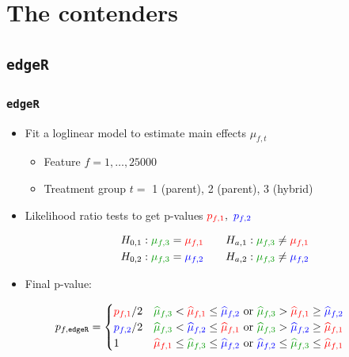 \documentclass[handout]{beamer}
\providecommand{\wh}[1]{\widehat{#1}}
\numberwithin{equation}{section}
\begin{document}
\section{The contenders}

\subsection{{\tt edgeR}}

\begin{frame}
\frametitle{{\tt edgeR}}

\begin{itemize}
\item Fit a loglinear model to estimate main effects $\mu_{f, t}$
\begin{itemize}
\item Feature $f = 1, \ldots, 25000$
\item Treatment group $t = $ {\color{red} 1 (parent)}, {\color{blue} 2 (parent)}, {\color{dkgreen} 3 (hybrid)}
\end{itemize}
\pause \item Likelihood ratio tests to get p-values ${\color{red} p_{f, 1}}, \ {\color{blue} p_{f, 2}}$

\begin{align*}
H_{0, 1}:{\color{dkgreen} \mu_{f, 3}} &= {\color{red}\mu_{f, 1}} \qquad H_{a, 1}: {\color{dkgreen}\mu_{f, 3}} \ne {\color{red} \mu_{f, 1}} \\
H_{0, 2}: {\color{dkgreen} \mu_{f, 3}} &= {\color{blue} \mu_{f, 2}} \qquad H_{a, 2}: {\color{dkgreen}\mu_{f, 3}} \ne {\color{blue}\mu_{f, 2}}
\end{align*}


\pause \item Final p-value:

\end{itemize}


\begin{align*}
p_{f, \text{{\tt edgeR}}} &= \begin{cases}
{\color{red}p_{f, 1}}/{2} &{\color{dkgreen} \wh{\mu}_{f, 3} }< {\color{red}\wh{\mu}_{f, 1}} \le {\color{blue}\wh{\mu}_{f, 2}} \text{ or }{\color{dkgreen}\wh{\mu}_{f, 3}} > {\color{red}\wh{\mu}_{f, 1}} \ge {\color{blue}\wh{\mu}_{f, 2}} \\
{\color{blue}p_{f, 2}}/{2} &{\color{dkgreen} \wh{\mu}_{f, 3}} < {\color{blue}\wh{\mu}_{f, 2}} \le {\color{red}\wh{\mu}_{f, 1}} \text{ or }{\color{dkgreen}\wh{\mu}_{f, 3}} > {\color{blue}\wh{\mu}_{f, 2}} \ge {\color{red}\wh{\mu}_{f, 1}} \\
1 & {\color{red}\wh{\mu}_{f, 1}} \le {\color{dkgreen} \wh{\mu}_{f, 3}} \le {\color{blue}\wh{\mu}_{f, 2}} \text{ or } {\color{blue}\wh{\mu}_{f, 2}} \le{\color{dkgreen} \wh{\mu}_{f, 3}} \le {\color{red}\wh{\mu}_{f, 1}}
\end{cases}
\end{align*}
\end{frame}
\end{document}

